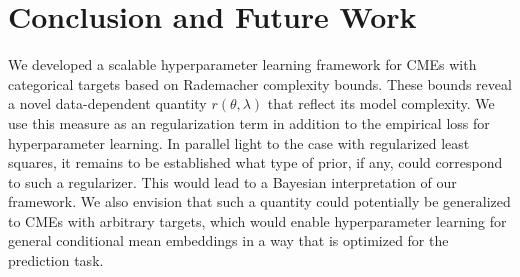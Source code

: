 \documentclass[runningheads, envcountsame, a4paper]{llncs}
\begin{document}
	\section{Conclusion and Future Work}
	
		We developed a scalable hyperparameter learning framework for \glspl{CME} with categorical targets based on Rademacher complexity bounds. These bounds reveal a novel data-dependent quantity $r(\theta, \lambda)$ that reflect its model complexity. We use this measure as an regularization term in addition to the empirical loss for hyperparameter learning. In parallel light to the case with regularized least squares, it remains to be established what type of prior, if any, could correspond to such a regularizer. This would lead to a Bayesian interpretation of our framework. We also envision that such a quantity could potentially be generalized to \glspl{CME} with arbitrary targets, which would enable hyperparameter learning for general conditional mean embeddings in a way that is optimized for the prediction task.
	

\end{document}
